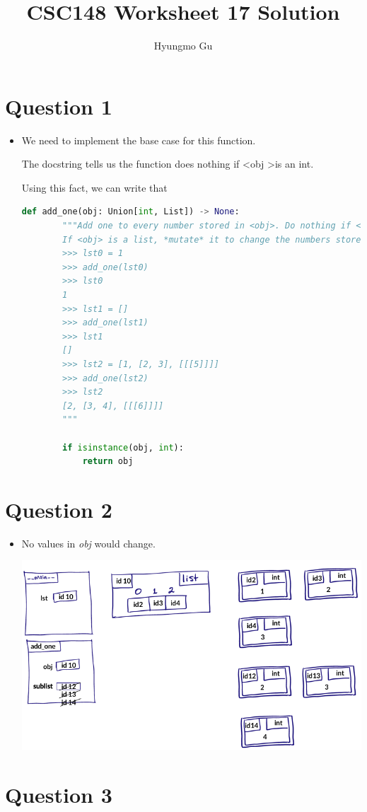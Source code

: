\documentclass[12pt]{article}
\begin{document}
\title{CSC148 Worksheet 17 Solution}
\author{Hyungmo Gu}
\maketitle

\section*{Question 1}
\begin{itemize}
    \item

    We need to implement the base case for this function.

    \bigskip

    The docstring tells us the function does nothing if \textless obj \textgreater is an int.

    \bigskip

    Using this fact, we can write that

    \bigskip

    \begin{lstlisting}[language=python,caption={worksheet\_17\_q1\_solution.py}]
    def add_one(obj: Union[int, List]) -> None:
        """Add one to every number stored in <obj>. Do nothing if <obj> is an int.
        If <obj> is a list, *mutate* it to change the numbers stored.
        >>> lst0 = 1
        >>> add_one(lst0)
        >>> lst0
        1
        >>> lst1 = []
        >>> add_one(lst1)
        >>> lst1
        []
        >>> lst2 = [1, [2, 3], [[[5]]]]
        >>> add_one(lst2)
        >>> lst2
        [2, [3, 4], [[[6]]]]
        """

        if isinstance(obj, int):
            return obj
    \end{lstlisting}
\end{itemize}

\section*{Question 2}
\begin{itemize}
    \item No values in \textit{obj} would change.

    \begin{center}
    \includegraphics[width=0.8 \linewidth]{images/worksheet_17_q2_solution.png}
    \end{center}
\end{itemize}


\section*{Question 3}
\end{document}
